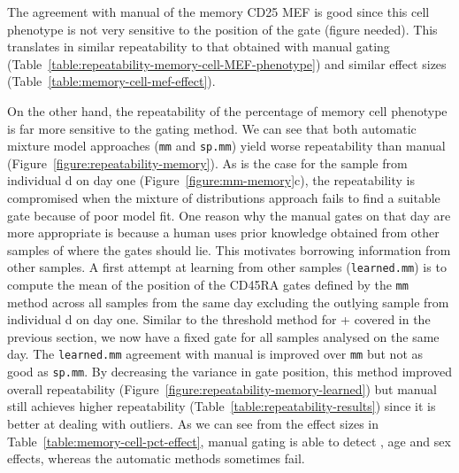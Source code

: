 The agreement with manual of the memory CD25 MEF is good since this cell phenotype is not very sensitive to the position of the  gate (figure needed).
This translates in similar repeatability to that obtained with manual gating (Table~\ref{table:repeatability-memory-cell-MEF-phenotype}) and similar effect sizes
(Table~\ref{table:memory-cell-mef-effect}).

On the other hand, the repeatability of the percentage of memory cell phenotype is far more sensitive to the gating method.
We can see that both automatic mixture model approaches (\texttt{mm} and \texttt{sp.mm}) yield worse repeatability than manual (Figure~\ref{figure:repeatability-memory}).
As is the case for the sample from individual d on day one (Figure~\ref{figure:mm-memory}c),
the repeatability is compromised when the mixture of distributions approach fails to find a suitable gate because of poor model fit.
One reason why the manual gates on that day are more appropriate is because a human uses prior knowledge obtained from other samples of where the gates should lie.
This motivates borrowing information from other samples.
A first attempt at learning from other samples (\texttt{learned.mm}) is to compute the mean of the position of the CD45RA gates defined by the \texttt{mm}
method across all samples from the same day excluding the outlying sample from individual d on day one.
Similar to the threshold method for + covered in the previous section, we now have a fixed gate for all samples analysed on the same day.
The \texttt{learned.mm} agreement with manual is improved over \texttt{mm} but not as good as \texttt{sp.mm}.
By decreasing the variance in gate position, this method improved overall repeatability (Figure~\ref{figure:repeatability-memory-learned})
but manual still achieves higher repeatability (Table~\ref{table:repeatability-results}) since it is better at dealing with outliers.
As we can see from the effect sizes in Table~\ref{table:memory-cell-pct-effect}, manual gating is able to detect ,
age and sex effects, whereas the automatic methods sometimes fail.

